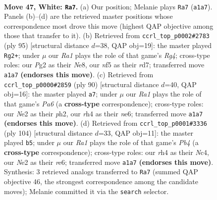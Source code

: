\documentclass[11pt]{article}
\begin{document}
\clearpage

\begin{figure}[p]\centering
\begin{subfigure}{0.46\textwidth}\centering
\resizebox{\linewidth}{!}{%
\newchessgame
\chessboard[
  setfen={4r3/8/3p1kp1/5n1p/7r/1p6/3RNKP1/R7 w - - 0 47},
  showmover=false,
  pgfstyle=straightmove, color=movearrow, markmove={a1-a7}
]}
\caption{}
\end{subfigure}\hfill
\begin{subfigure}{0.46\textwidth}\centering
\resizebox{\linewidth}{!}{%
\newchessgame
\chessboard[
  setfen={4nk2/3R4/R5p1/6r1/P2N4/1P2r3/1K6/8 b - - 0 48},
  showmover=false,
  pgfstyle=straightmove, color=movearrow, markmove={g5-g2}
]}
\caption{}
\end{subfigure}
\\[4pt]
\begin{subfigure}{0.46\textwidth}\centering
\resizebox{\linewidth}{!}{%
\newchessgame
\chessboard[
  setfen={8/5pk1/P1p1n3/8/1P5R/2NK1P2/5r1p/8 w - - 4 46},
  showmover=false,
  pgfstyle=straightmove, color=movearrow, markmove={a6-a7}
]}
\caption{}
\end{subfigure}\hfill
\begin{subfigure}{0.46\textwidth}\centering
\resizebox{\linewidth}{!}{%
\newchessgame
\chessboard[
  setfen={2k5/4p3/4rp2/6n1/1PN3P1/1K1R3p/7P/8 w - - 1 53},
  showmover=false,
  pgfstyle=straightmove, color=movearrow, markmove={b4-b5}
]}
\caption{}
\end{subfigure}
\caption{\textbf{Move 47, White: \texttt{Ra7}.} (a) Our position; Melanie plays \texttt{Ra7} (\texttt{a1a7}). Panels (b)--(d) are the retrieved master positions whose correspondence most drove this move (highest QAP objective among those that transfer to it). (b) Retrieved from \texttt{ccrl\_top\_p0002\#2783} (ply 95) [structural distance $d$=38, QAP obj=19]: the master played \texttt{Rg2+}; under $\mu$ our \emph{Ra1} plays the role of that game's \emph{Rg4}; cross-type roles: our \emph{P}g2 as their \emph{N}e8, our \emph{n}f5 as their \emph{r}d7; transferred move \texttt{a1a7} \textbf{(endorses this move)}. (c) Retrieved from \texttt{ccrl\_top\_p0000\#2859} (ply 90) [structural distance $d$=40, QAP obj=16]: the master played \texttt{a7}; under $\mu$ our \emph{Ra1} plays the role of that game's \emph{Pa6} (a \textbf{cross-type} correspondence); cross-type roles: our \emph{N}e2 as their \emph{p}h2, our \emph{r}h4 as their \emph{n}e6; transferred move \texttt{a1a7} \textbf{(endorses this move)}. (d) Retrieved from \texttt{ccrl\_top\_p0001\#3336} (ply 104) [structural distance $d$=33, QAP obj=11]: the master played \texttt{b5}; under $\mu$ our \emph{Ra1} plays the role of that game's \emph{Pb4} (a \textbf{cross-type} correspondence); cross-type roles: our \emph{r}h4 as their \emph{N}c4, our \emph{N}e2 as their \emph{r}e6; transferred move \texttt{a1a7} \textbf{(endorses this move)}. Synthesis: 3 retrieved analogs transferred to \texttt{Ra7} (summed QAP objective 46, the strongest correspondence among the candidate moves); Melanie committed it via the \texttt{search} selector.}
\label{fig:thought-m92}
\end{figure}
\end{document}
